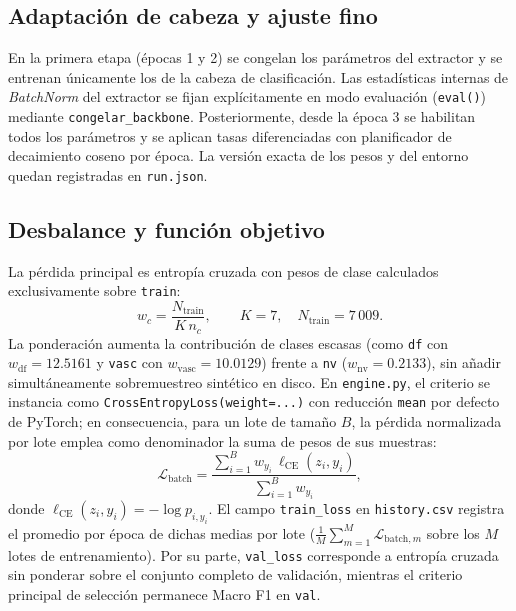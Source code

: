 \subsection{Adaptación de cabeza y ajuste fino}
En la primera etapa (épocas 1 y 2) se congelan los parámetros del extractor y se entrenan únicamente los de la cabeza de clasificación. Las estadísticas internas de \textit{BatchNorm} del extractor se fijan explícitamente en modo evaluación (\texttt{eval()}) mediante \texttt{congelar\_backbone}. Posteriormente, desde la época 3 se habilitan todos los parámetros y se aplican tasas diferenciadas con planificador de decaimiento coseno por época. La versión exacta de los pesos y del entorno quedan registradas en \texttt{run.json}.

\subsection{Desbalance y función objetivo}
La pérdida principal es entropía cruzada con pesos de clase calculados exclusivamente sobre \texttt{train}:
\begin{equation}
w_c=\frac{N_{\mathrm{train}}}{K\,n_c},\qquad K=7,\quad N_{\mathrm{train}}=7\,009.
\end{equation}
La ponderación aumenta la contribución de clases escasas (como \texttt{df} con $w_{\mathrm{df}}=12.5161$ y \texttt{vasc} con $w_{\mathrm{vasc}}=10.0129$) frente a \texttt{nv} ($w_{\mathrm{nv}}=0.2133$), sin añadir simultáneamente sobremuestreo sintético en disco. En \texttt{engine.py}, el criterio se instancia como \texttt{CrossEntropyLoss(weight=...)} con reducción \texttt{mean} por defecto de PyTorch; en consecuencia, para un lote de tamaño $B$, la pérdida normalizada por lote emplea como denominador la suma de pesos de sus muestras:
\begin{equation}
\mathcal{L}_{\mathrm{batch}} = \frac{\sum_{i=1}^{B} w_{y_i}\,\ell_{\mathrm{CE}}(z_i, y_i)}{\sum_{i=1}^{B} w_{y_i}},
\end{equation}
donde $\ell_{\mathrm{CE}}(z_i, y_i) = -\log p_{i,y_i}$. El campo \texttt{train\_loss} en \texttt{history.csv} registra el promedio por época de dichas medias por lote ($\frac{1}{M}\sum_{m=1}^{M}\mathcal{L}_{\mathrm{batch},m}$ sobre los $M$ lotes de entrenamiento). Por su parte, \texttt{val\_loss} corresponde a entropía cruzada sin ponderar sobre el conjunto completo de validación, mientras el criterio principal de selección permanece Macro F1 en \texttt{val}.


